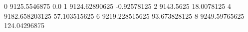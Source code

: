 0 9125.5546875 0.0
1 9124.62890625 -0.92578125
2 9143.5625 18.0078125
4 9182.658203125 57.103515625
6 9219.228515625 93.673828125
8 9249.59765625 124.04296875
